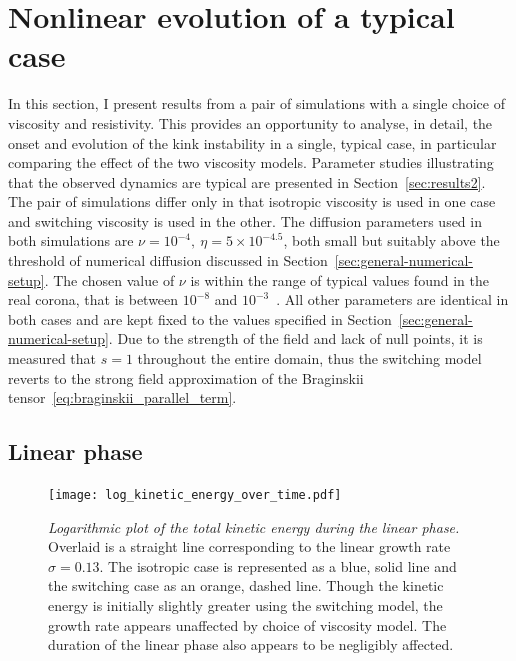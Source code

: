 \section{Nonlinear evolution of a typical case}
\label{sec:results}

In this section, I present results from a pair of simulations with a single choice of viscosity and resistivity. This provides an opportunity to analyse, in detail, the onset and evolution of the kink instability in a single, typical case, in particular comparing the effect of the two viscosity models. Parameter studies illustrating that the observed dynamics are typical are presented in Section~\ref{sec:results2}. The pair of simulations differ only in that isotropic viscosity is used in one case and switching viscosity is used in the other. The diffusion parameters used in both simulations are $\nu = 10^{-4},\ \eta = 5\times 10^{-4.5}$, both small but suitably above the threshold of numerical diffusion discussed in Section~\ref{sec:general-numerical-setup}. The chosen value of $\nu$ is within the range of typical values found in the real corona, that is between $10^{-8}$ and $10^{-3}$~\cite{rudermanSlowSurfaceWave2000a}. All other parameters are identical in both cases and are kept fixed to the values specified in Section~\ref{sec:general-numerical-setup}. Due to the strength of the field and lack of null points, it is measured that $s=1$ throughout the entire domain, thus the switching model reverts to the strong field approximation of the Braginskii tensor~\eqref{eq:braginskii_parallel_term}.

\subsection{Linear phase}

\begin{figure}[t]
  \centering
  \texttt{[image: log\_kinetic\_energy\_over\_time.pdf]}
  \caption{\textit{Logarithmic plot of the total kinetic
      energy during the linear phase.} Overlaid is a straight
    line corresponding to the linear growth rate $\sigma = 0.13$. The
    isotropic case is represented as a blue, solid line and the
    switching case as an orange, dashed line. Though the kinetic energy is initially slightly greater using the switching model, the growth rate appears unaffected by choice of viscosity model. The duration of the linear phase also appears to be negligibly affected.}%
  \label{fig:log_kinetic_energy_over_time}
\end{figure}

